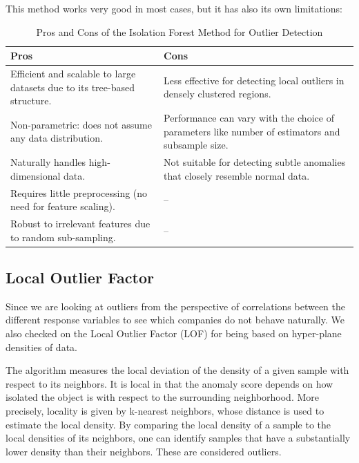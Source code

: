 \documentclass[11pt,english,a4paper,hidelinks]{book}
\begin{document}
\noindent This method works very good in most cases, but it has also its own limitations:

\begin{table}[H]
    \centering
    \begin{tabular}{|p{7cm}|p{7cm}|}
    \hline
    \textbf{Pros} & \textbf{Cons} \\
    \hline
    Efficient and scalable to large datasets due to its tree-based structure. & Less effective for detecting local outliers in densely clustered regions. \\
    \hline
    Non-parametric: does not assume any data distribution. & Performance can vary with the choice of parameters like number of estimators and subsample size. \\
    \hline
    Naturally handles high-dimensional data. & Not suitable for detecting subtle anomalies that closely resemble normal data. \\
    \hline
    Requires little preprocessing (no need for feature scaling). & -- \\
    \hline
    Robust to irrelevant features due to random sub-sampling. & -- \\
    \hline
    \end{tabular}
    \caption{Pros and Cons of the Isolation Forest Method for Outlier Detection}
\end{table}

\subsection{Local Outlier Factor}

Since we are looking at outliers from the perspective of correlations between the different response variables to see which companies do not behave naturally. We also checked on the Local Outlier Factor (LOF) for being based on hyper-plane densities of data.

\vspace{0.5cm}
\noindent The algorithm measures the local deviation of the density of a given sample with respect to its neighbors. It is local in that the anomaly score depends on how isolated the object is with respect to the surrounding neighborhood. More precisely, locality is given by k-nearest neighbors, whose distance is used to estimate the local density. By comparing the local density of a sample to the local densities of its neighbors, one can identify samples that have a substantially lower density than their neighbors. These are considered outliers. \textcite{breunig2000lof}
\end{document}
